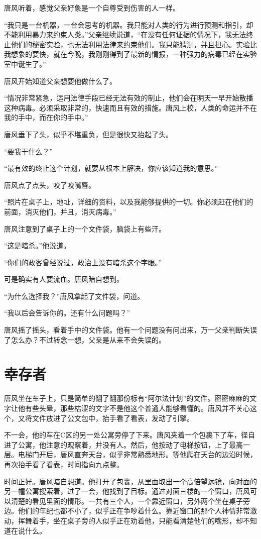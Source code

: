 唐风听着，感觉父亲好象是一个自尊受到伤害的人一样。

“我只是一台机器，一台会思考的机器。我只能对人类的行为进行预测和指引，却不能利用暴力来约束人类。”父亲继续说道，“在没有任何证据的情况下，我无法终止他们的秘密实验，也无法利用法律来约束他们。我只能猜测，并且担心。实验比我想象的要快，就在今晚，我刚刚得到了最新的情报，一种强力的病毒已经在实验室中诞生了。”

唐风开始知道父亲想要他做什么了。

“情况非常紧急，运用法律手段已经无法有效的制止，他们会在明天一早开始散播这种病毒。必须采取非常的，快速而且有效的措施。唐风上校，人类的命运并不在我的手中，而在你的手中。”

唐风垂下了头，似乎不堪重负，但是很快又抬起了头。

“要我干什么？”

“最有效的终止这个计划，就要从根本上解决，你应该知道我的意思。”

唐风点了点头，咬了咬嘴唇。

“照片在桌子上，地址，详细的资料，以及我能够提供的一切。你必须赶在他们的前面，消灭他们，并且，消灭病毒。”

唐风注意到了桌子上的一个文件袋，脑袋上有些汗。

“这是暗杀。”他说道。

“你们的政客曾经说过，政治上没有暗杀这个字眼。”

可是确实有人要流血。唐风暗自想到。

“为什么选择我？”唐风拿起了文件袋，问道。

“我以后会告诉你的。还有什么问题吗？”

唐风摇了摇头，看着手中的文件袋。他有一个问题没有问出来，万一父亲判断失误了怎么办？不过转念一想，父亲是从来不会失误的。

\chapter{幸存者}

唐风坐在车子上，只是简单的翻了翻那份标有“阿尔法计划”的文件。密密麻麻的文字让他有些头晕，那些枯涩的文字不是他这个普通人能够看懂的。唐风并不关心这个，又将文件放进了公文包中，抬手看了看表，发动了引擎。

不一会，他的车在C区的另一处公寓旁停了下来。唐风夹着一个包裹下了车，径自进了公寓，他注意的观察着，并没有人。然后，他按动了电梯按钮，上了最高一层。电梯门开后，唐风直奔天台，似乎非常熟悉地形。等他爬在天台的边沿时候，再次抬手看了看表，时间指向九点整。

时间正好。唐风暗自想道。他打开了包裹，从里面取出一个高倍望远镜，向对面的另一幢公寓搜索着，过了一会，他找到了目标。通过对面三楼的一个窗口，唐风可以清楚的看见里面的情形。一共有三个人，一个靠近窗口，另外两个坐在桌子旁边。他们的年纪也都不小了，似乎正在争吵着什么。靠近窗口的那个人神情非常激动，挥舞着手，坐在桌子旁的人似乎正在劝着他，只能看清楚他们的嘴形，却不知道在说什么。

